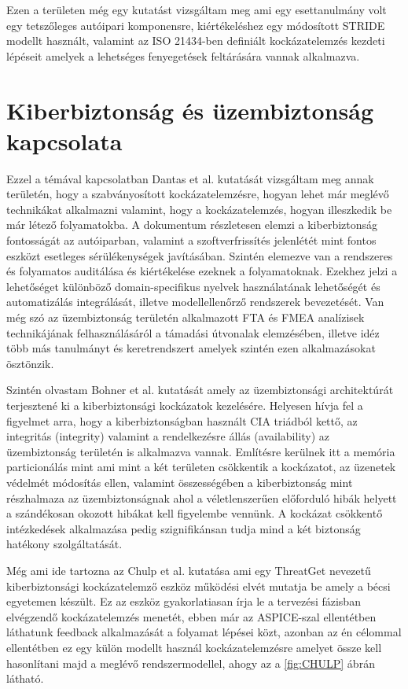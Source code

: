 Ezen a területen még egy kutatást \cite{Vivek} vizsgáltam meg ami egy esettanulmány volt egy tetszőleges autóipari komponensre, kiértékeléshez egy módosított STRIDE modellt használt, valamint az ISO 21434-ben definiált kockázatelemzés kezdeti lépéseit amelyek a lehetséges fenyegetések feltárására vannak alkalmazva.

\section{Kiberbiztonság és üzembiztonság kapcsolata}

Ezzel a témával kapcsolatban Dantas et al. \cite{Dantas} kutatását vizsgáltam meg annak területén, hogy a szabványosított kockázatelemzésre, hogyan lehet már meglévő technikákat alkalmazni valamint, hogy a kockázatelemzés, hogyan illeszkedik be már létező folyamatokba. A dokumentum részletesen elemzi a kiberbiztonság fontosságát az autóiparban, valamint a szoftverfrissítés jelenlétét mint fontos eszközt esetleges sérülékenységek javításában. Szintén elemezve van a rendszeres és folyamatos auditálása és kiértékelése ezeknek a folyamatoknak. Ezekhez jelzi a lehetőséget különböző domain-specifikus nyelvek használatának lehetőségét és automatizálás integrálását, illetve modellellenőrző rendszerek bevezetését. Van még szó az üzembiztonság területén alkalmazott FTA és FMEA analízisek technikájának felhasználásáról a támadási útvonalak elemzésében, illetve idéz több más tanulmányt és keretrendszert amelyek szintén ezen alkalmazásokat ösztönzik.

Szintén olvastam Bohner et al.\cite{Bohner} kutatását amely az üzembiztonsági architektúrát terjesztené ki a kiberbiztonsági kockázatok kezelésére. Helyesen hívja fel a figyelmet arra, hogy a kiberbiztonságban használt CIA triádból kettő, az integritás (integrity) valamint a rendelkezésre állás (availability) az üzembiztonság területén is alkalmazva vannak. Említésre kerülnek itt a memória particionálás mint ami mint a két területen csökkentik a kockázatot, az üzenetek védelmét módosítás ellen, valamint összességében a kiberbiztonság mint részhalmaza az üzembiztonságnak ahol a véletlenszerűen előforduló hibák helyett a szándékosan okozott hibákat kell figyelembe vennünk. A kockázat csökkentő intézkedések alkalmazása pedig szignifikánsan tudja mind a két biztonság hatékony szolgáltatását.

Még ami ide tartozna az Chulp et al.\cite{Chulp} kutatása ami egy ThreatGet nevezetű kiberbiztonsági kockázatelemző eszköz működési elvét mutatja be amely a bécsi egyetemen készült. Ez az eszköz gyakorlatiasan írja le a tervezési fázisban elvégzendő kockázatelemzés menetét, ebben már az ASPICE-szal ellentétben láthatunk feedback alkalmazását a folyamat lépései közt, azonban az én célommal ellentétben ez egy külön modellt használ kockázatelemzésre amelyet össze kell hasonlítani majd a meglévő rendszermodellel, ahogy az a \ref{fig:CHULP} ábrán látható.

